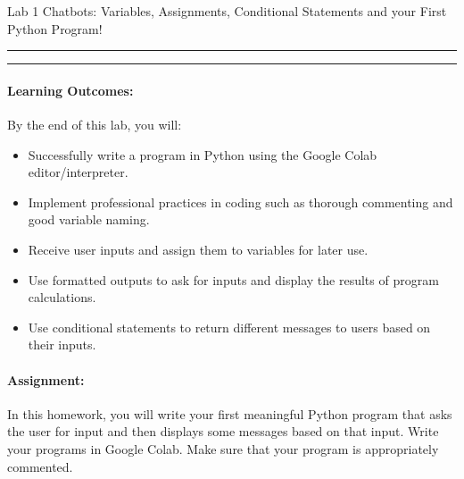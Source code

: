 \documentclass[10pt]{article}
\begin{document}
  \thispagestyle{empty}
  \def\cpp{C{\tt ++}\xspace}

  \begin{bf}
      Lab 1
      \hfill 
      Chatbots: Variables, Assignments, Conditional Statements and your First Python Program!
      \hfill
  \end{bf}

  \vspace*{10pt} \hrule \vspace*{1pt} \hrule

  \vspace*{-10pt}
  
  \paragraph{Learning Outcomes:} By the end of this lab, you will:
  \vspace*{-15pt}
\begin{itemize}
\setlength\itemsep{-0.5em}
    \item Successfully write a program in Python using the Google Colab
        editor/interpreter.
    \item Implement professional practices in coding such as 
        thorough commenting and good variable naming.
    \item Receive user inputs and assign them to variables for later use.
    \item Use formatted outputs to ask for inputs and display the results of
        program calculations.
    \item Use conditional statements to return different messages to users based on their inputs.
\end{itemize}
  \vspace*{-15pt}
  \paragraph{Assignment:}
  In this homework, you will write your first meaningful Python program that
  asks the user for input and then displays some messages based on that input.
  Write your programs in Google Colab. Make sure that your program is
  appropriately commented.
\end{document}

